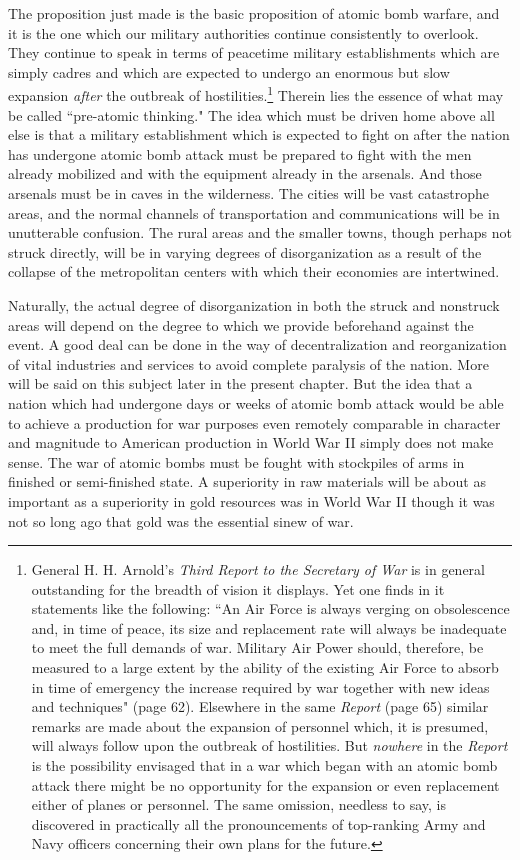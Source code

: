 The proposition just made is the basic proposition of atomic bomb warfare, and it is the one which our military authorities continue consistently to overlook. They continue to speak in terms of peacetime military establishments which are simply cadres and which are expected to undergo an enormous but slow expansion \emph{after} the outbreak of hostilities.\footnote{General H. H. Arnold's \textit{Third Report to the Secretary of War} is in general outstanding for the breadth of vision it displays. Yet one finds in it statements like the following: ``An Air Force is always verging on obsolescence and, in time of peace, its size and replacement rate will always be inadequate to meet the full demands of war. Military Air Power should, therefore, be measured to a large extent by the ability of the existing Air Force to absorb in time of emergency the increase required by war together with new ideas and techniques" (page 62). Elsewhere in the same \textit{Report} (page 65) similar remarks are made about the expansion of personnel which, it is presumed, will always follow upon the outbreak of hostilities. But \emph{nowhere} in the \textit{Report} is the possibility envisaged that in a war which began with an atomic bomb attack there might be no opportunity for the expansion or even replacement either of planes or personnel. The same omission, needless to say, is discovered in practically all the pronouncements of top-ranking Army and Navy officers concerning their own plans for the future.} Therein lies the essence of what may be called ``pre-atomic thinking." The idea which must be driven home above all else is that a military establishment which is expected to fight on after the nation has undergone atomic bomb attack must be prepared to fight with the men already mobilized and with the equipment already in the arsenals. And those arsenals must be in caves in the wilderness. The cities will be vast catastrophe areas, and the normal channels of transportation and communications will be in unutterable confusion. The rural areas and the smaller towns, though perhaps not struck directly, will be in varying degrees of disorganization as a result of the collapse of the metropolitan centers with which their economies are intertwined.

Naturally, the actual degree of disorganization in both the struck and nonstruck areas will depend on the degree to which we provide beforehand against the event. A good deal can be done in the way of decentralization and reorganization of vital industries and services to avoid complete paralysis of the nation. More will be said on this subject later in the present chapter. But the idea that a nation which had undergone days or weeks of atomic bomb attack would be able to achieve a production for war purposes even remotely comparable in character and magnitude to American production in World War II simply does not make sense. The war of atomic bombs must be fought with stockpiles of arms in finished or semi-finished state. A superiority in raw materials will be about as important as a superiority in gold resources was in World War II though it was not so long ago that gold was the essential sinew of war.

